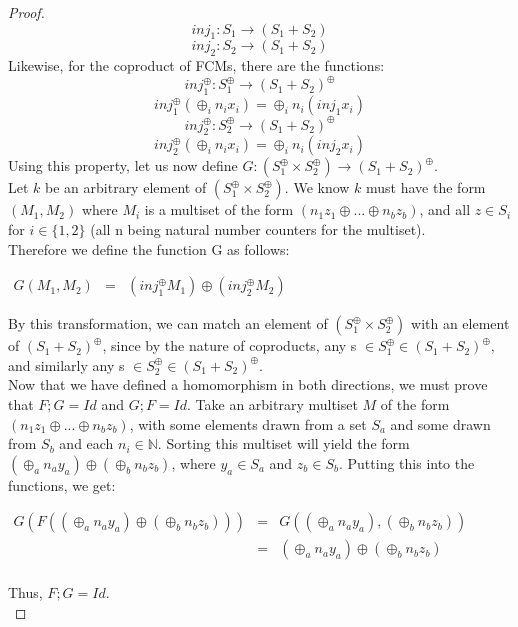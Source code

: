 \begin{lemma}
\begin{proof}
\[inj_1: S_1 \to (S_1 + S_2) \]
\[inj_2: S_2 \to (S_1 + S_2)\]
Likewise, for the coproduct of FCMs, there are the functions: \\
\[inj^\oplus_1: S_1^\oplus \to (S_1 + S_2)^\oplus  \]
\[inj^\oplus_1(\oplus_i n_i x_i) = \oplus_i n_i(inj_1 x_i)\]
\smallskip
\[inj^\oplus_2: S_2^\oplus \to (S_1 + S_2)^\oplus \]
\[ inj^\oplus_2(\oplus_i n_i x_i) = \oplus_i n_i(inj_2 x_i)\]
Using this property, let us now define $G: (S_1 ^\oplus \times S_2 ^\oplus) \to (S_1 + S_2)^\oplus$.\\
Let $k$ be an arbitrary element of $(S_1 ^\oplus \times S_2 ^\oplus)$. We know $k$ must have the form $(M_1 , M_2)$ where $M_i$ is a multiset of the form $(n_1z_1 \oplus ... \oplus n_bz_b)$, and all $z \in S_i$ for $i\in\{1, 2\}$ (all n being natural number counters for the multiset).\\
Therefore we define the function G as follows:\\
\begin{center}
  \begin{math}
    \begin{array}{lll}
       G(M_1, M_2) & = & (inj_1^\oplus M_1) \oplus (inj_2^\oplus M_2)
    \end{array}
  \end{math}
\end{center}
By this transformation, we can match an element of $(S_1 ^\oplus \times S_2 ^\oplus)$ with an element of $(S_1 + S_2)^\oplus$, since by the nature of coproducts, any s $\in S_1^\oplus \in (S_1+S_2)^\oplus$, and similarly any s $\in S_2^\oplus \in (S_1+S_2)^\oplus$.\bigskip \\

Now that we have defined a homomorphism in both directions, we must
prove that $F;G = Id$ and $G;F = Id$. Take an arbitrary multiset $M$
of the form $(n_1z_1 \oplus ... \oplus n_bz_b)$, with some elements
drawn from a set $S_a$ and some drawn from $S_b$ and each $n_i \in
\mathbb{N}$. Sorting this multiset will yield the form $(\oplus_a n_a
y_a) \oplus (\oplus_b n_b z_b)$, where $y_a \in S_a$ and $z_b \in
S_b$. Putting this into the functions, we get:
\begin{center}
  \begin{math}
    \begin{array}{lll}
      G(F((\oplus_a n_a y_a) \oplus (\oplus_b n_b z_b)))
      & = & G((\oplus_a n_a y_a), (\oplus_b n_b z_b))\\
      & = & (\oplus_a n_a y_a) \oplus (\oplus_b n_b z_b)\\
    \end{array}
  \end{math}
\end{center}
Thus, $F;G = Id$.\\


\end{proof}
\end{lemma}
